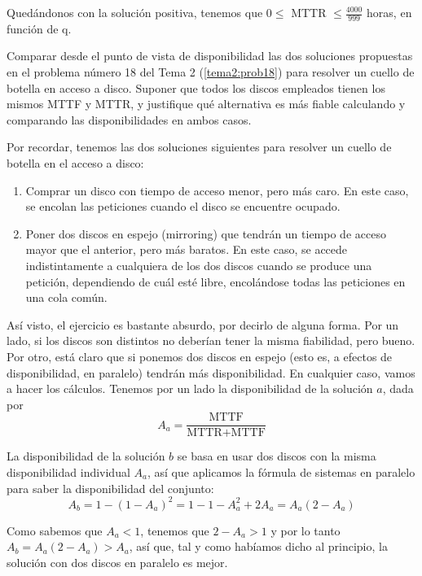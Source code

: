 \begin{problem}[8]
Quedándonos con la solución positiva, tenemos que $0 \leq$ MTTR $\leq \frac{4000}{999}$ horas, en función de q.

\end{problem}

\begin{problem}[9]
Comparar desde el punto de vista de disponibilidad las dos soluciones propuestas en el problema número 18 del Tema 2 (\ref{tema2:prob18}) para resolver un cuello de botella en acceso a disco. Suponer que todos los discos empleados tienen los mismos MTTF y MTTR, y justifique qué alternativa es más fiable calculando y comparando las disponibilidades en ambos casos.

\solution
{}

Por recordar, tenemos las dos soluciones siguientes para resolver un cuello de botella en el acceso a disco:

\begin{enumerate}
\item Comprar un disco con tiempo de acceso menor, pero más caro. En este caso, se encolan las peticiones cuando el disco se encuentre ocupado.
\item Poner dos discos en espejo (mirroring) que tendrán un tiempo de acceso mayor que el anterior, pero más baratos. En este caso, se accede indistintamente a cualquiera de los dos discos cuando se produce una petición, dependiendo de cuál esté libre, encolándose todas las peticiones en una cola común.
\end{enumerate}

Así visto, el ejercicio es bastante absurdo, por decirlo de alguna forma. Por un lado, si los discos son distintos no deberían tener la misma fiabilidad, pero bueno. Por otro, está claro que si ponemos dos discos en espejo (esto es, a efectos de disponibilidad, en paralelo) tendrán más disponibilidad. En cualquier caso, vamos a hacer los cálculos. Tenemos por un lado la disponibilidad de la solución $a$, dada por \[ A_a = \frac{\text{MTTF}}{\text{MTTR} + \text{MTTF}} \]

La disponibilidad de la solución $b$ se basa en usar dos discos con la misma disponibilidad individual $A_a$, así que aplicamos la fórmula de sistemas en paralelo para saber la disponibilidad del conjunto: \[ A_b = 1 - (1- A_a)^2 = 1 - 1 - A_a^2 + 2A_a = A_a(2 - A_a) \]

Como sabemos que $A_a < 1$, tenemos que $2 - A_a > 1$ y por lo tanto $A_b = A_a(2-A_a) > A_a$, así que, tal y como habíamos dicho al principio, la solución con dos discos en paralelo es mejor.

\end{problem}

